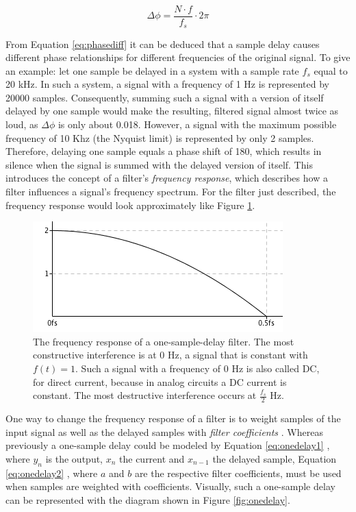 \begin{equation}
  \Delta\phi = \frac{N \cdot f}{f_{s}} \cdot 2\pi
  \label{eq:phasediff}
\end{equation}

\noindent From Equation \ref{eq:phasediff} it can be deduced that a sample delay causes different phase relationships for different frequencies of the original signal. To give an example: let one sample be delayed in a system with a sample rate $f_{s}$ equal to 20 kHz. In such a system, a signal with a frequency of 1 Hz is represented by 20000 samples. Consequently, summing such a signal with a version of itself delayed by one sample would make the resulting, filtered signal almost twice as loud, as $\Delta\phi$ is only about 0.018\degree. However, a signal with the maximum possible frequency of 10 Khz (the Nyquist limit) is represented by only 2 samples. Therefore, delaying one sample equals a phase shift of 180\degree, which results in silence when the signal is summed with the delayed version of itself. This introduces the concept of a filter's \emph{frequency response}, which describes how a filter influences a signal's frequency spectrum. For the filter just described, the frequency response would look approximately like Figure \ref{fig:freqresp}.\\

\begin{figure}
  \includegraphics[scale=0.8]{img/freqresp}
  \caption{The frequency response of a one-sample-delay filter. The most constructive interference is at 0 Hz, a signal that is constant with $f(t) = 1$. Such a signal with a frequency of 0 Hz is also called DC, for direct current, because in analog circuits a DC current is constant. The most destructive interference occurs at $\frac{f_{s}}{2}$ Hz.}
  \label{fig:freqresp}
\end{figure}

\noindent One way to change the frequency response of a filter is to weight samples of the input signal as well as the delayed samples with \emph{filter coefficients} . Whereas previously a one-sample delay could be modeled by Equation \ref{eq:onedelay1} , where $y_{n}$ is the output, $x_{n}$ the current and $x_{n-1}$ the delayed sample, Equation \ref{eq:onedelay2} , where $a$ and $b$ are the respective filter coefficients, must be used when samples are weighted with coefficients. Visually, such a one-sample delay can be represented with the diagram shown in Figure \ref{fig:onedelay}.

